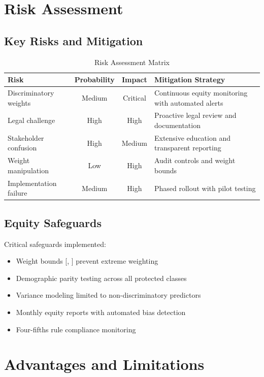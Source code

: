 \section{Risk Assessment}

\subsection{Key Risks and Mitigation}

\begin{table}[h]
\centering
\caption{Risk Assessment Matrix}
\begin{tabular}{p{3cm}ccp{5cm}}
\toprule
\textbf{Risk} & \textbf{Probability} & \textbf{Impact} & \textbf{Mitigation Strategy} \\
\midrule
Discriminatory weights & Medium & Critical & Continuous equity monitoring with automated alerts \\
Legal challenge & High & High & Proactive legal review and documentation \\
Stakeholder confusion & High & Medium & Extensive education and transparent reporting \\
Weight manipulation & Low & High & Audit controls and weight bounds \\
Implementation failure & Medium & High & Phased rollout with pilot testing \\
\bottomrule
\end{tabular}
\end{table}

\subsection{Equity Safeguards}

Critical safeguards implemented:
\begin{itemize}
    \item Weight bounds [\ModelFourWeightMin{}, \ModelFourWeightMax{}] prevent extreme weighting
    \item Demographic parity testing across all protected classes
    \item Variance modeling limited to non-discriminatory predictors
    \item Monthly equity reports with automated bias detection
    \item Four-fifths rule compliance monitoring
\end{itemize}

\section{Advantages and Limitations}

